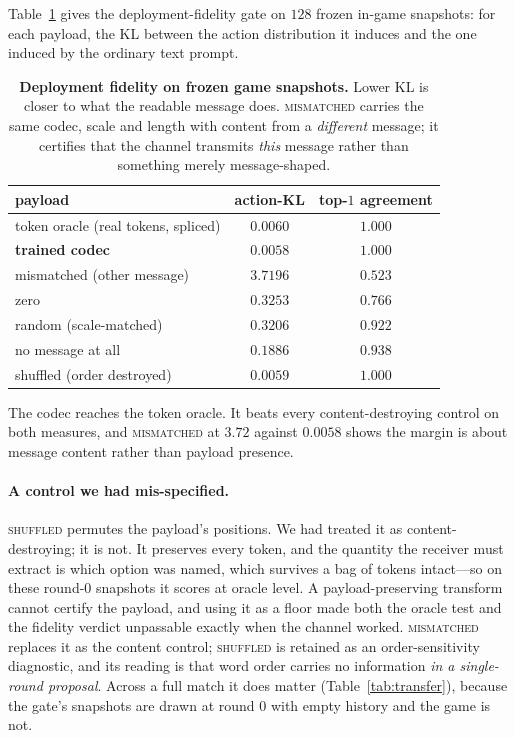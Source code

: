 Table~\ref{tab:fidelity} gives the deployment-fidelity gate on $128$ frozen in-game
snapshots: for each payload, the KL between the action distribution it induces and the
one induced by the ordinary text prompt.

\begin{table}[t]
\centering\small
\caption{\textbf{Deployment fidelity on frozen game snapshots.} Lower KL is closer to
what the readable message does. \textsc{mismatched} carries the same codec, scale and
length with content from a \emph{different} message; it certifies that the channel
transmits \emph{this} message rather than something merely message-shaped.}
\label{tab:fidelity}
\begin{tabular}{lcc}
\toprule
payload & action-KL & top-$1$ agreement \\
\midrule
token oracle (real tokens, spliced) & $0.0060$ & $1.000$ \\
\textbf{trained codec}              & $\mathbf{0.0058}$ & $\mathbf{1.000}$ \\
\midrule
mismatched (other message)          & $3.7196$ & $0.523$ \\
zero                                & $0.3253$ & $0.766$ \\
random (scale-matched)              & $0.3206$ & $0.922$ \\
no message at all                   & $0.1886$ & $0.938$ \\
shuffled (order destroyed)          & $0.0059$ & $1.000$ \\
\bottomrule
\end{tabular}
\end{table}

The codec reaches the token oracle. It beats every content-destroying control on both
measures, and \textsc{mismatched} at $3.72$ against $0.0058$ shows the margin is about
message content rather than payload presence.

\paragraph{A control we had mis-specified.}
\textsc{shuffled} permutes the payload's positions. We had treated it as
content-destroying; it is not. It preserves every token, and the quantity the receiver
must extract is which option was named, which survives a bag of tokens intact---so on
these round-$0$ snapshots it scores at oracle level. A payload-preserving transform
cannot certify the payload, and using it as a floor made both the oracle test and the
fidelity verdict unpassable exactly when the channel worked. \textsc{mismatched}
replaces it as the content control; \textsc{shuffled} is retained as an
order-sensitivity diagnostic, and its reading is that word order carries no information
\emph{in a single-round proposal}. Across a full match it does matter
(Table~\ref{tab:transfer}), because the gate's snapshots are drawn at round $0$ with
empty history and the game is not.

